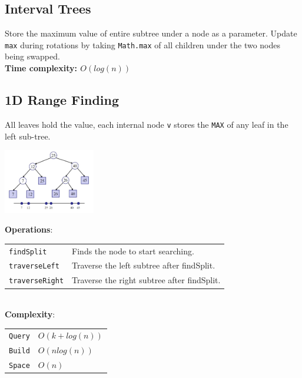 \documentclass[10pt,landscape,a4paper]{article}
\begin{document}
\begin{multicols*}{4}
\subsection{Interval Trees}
Store the maximum value of entire subtree under a node as a parameter. Update \texttt{max} during rotations by taking \texttt{Math.max} of all children under the two nodes being swapped. \\
\textbf{Time complexity: $O(log(n))$} \\

\subsection{1D Range Finding}
All leaves hold the value, each internal node \texttt{v} stores the \texttt{MAX} of any leaf in the left sub-tree. \\
\begin{center}
    \includegraphics[width = 4cm]{1d-range}
\end{center}
\textbf{Operations}: \\
\begin{tabular}{p{2cm} p{3.5cm}}
    \verb!findSplit!        & Finds the node to start searching. \\
    \verb!traverseLeft!     & Traverse the left subtree after findSplit. \\
    \verb!traverseRight!    & Traverse the right subtree after findSplit.\\
\end{tabular}\\
\textbf{Complexity}: \\
\begin{tabular}{p{2cm} p{3.5cm}}    
    \verb!Query!    & $O(k + log(n))$ \\
    \verb!Build!    & $O(nlog(n))$ \\
    \verb!Space!    & $O(n)$ \\
\end{tabular}

\end{multicols*}
\end{document}
